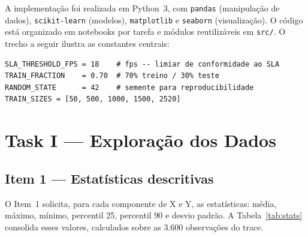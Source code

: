 \documentclass[12pt,a4paper]{article}
\begin{document}
A implementação foi realizada em Python~3, com \texttt{pandas} (manipulação de dados),
\texttt{scikit-learn} (modelos), \texttt{matplotlib} e \texttt{seaborn}
(visualização). O código está organizado em notebooks por tarefa e módulos
reutilizáveis em \texttt{src/}. O trecho a seguir ilustra as constantes centrais:

\begin{lstlisting}[caption={Constantes centrais do projeto (\texttt{src/config.py}).}]
SLA_THRESHOLD_FPS = 18    # fps -- limiar de conformidade ao SLA
TRAIN_FRACTION    = 0.70  # 70% treino / 30% teste
RANDOM_STATE      = 42    # semente para reproducibilidade
TRAIN_SIZES = [50, 500, 1000, 1500, 2520]
\end{lstlisting}

\section{Task I --- Exploração dos Dados}

\subsection{Item 1 --- Estatísticas descritivas}

O Item~1 solicita, para cada componente de X e Y, as estatísticas: média, máximo,
mínimo, percentil 25, percentil 90 e desvio padrão. A Tabela~\ref{tab:stats}
consolida esses valores, calculados sobre as 3.600 observações do trace.
\end{document}
